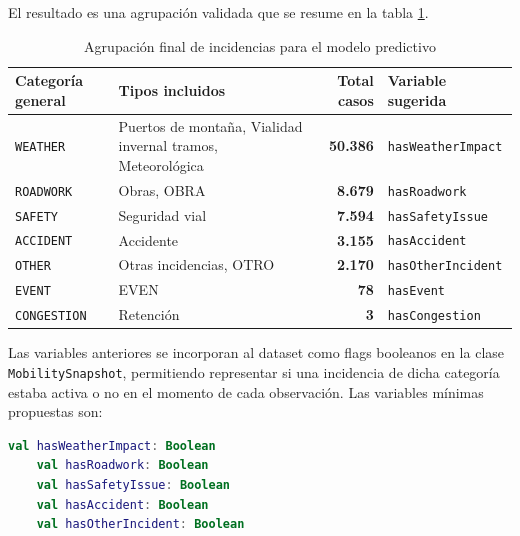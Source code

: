El resultado es una agrupación validada que se resume en la tabla \ref{tab:agrupacion_incidencias}.

\begin{table}[H]
	\centering
	\small
	\caption{Agrupación final de incidencias para el modelo predictivo}
	\label{tab:agrupacion_incidencias}
	\begin{tabularx}{\textwidth}{lXrX}
		\toprule
		\textbf{Categoría general} & \textbf{Tipos incluidos} & \textbf{Total casos} & \textbf{Variable sugerida} \\
		\midrule
		\texttt{WEATHER}    & Puertos de montaña, Vialidad invernal tramos, Meteorológica  & \textbf{50.386} & \texttt{hasWeatherImpact} \\
		\texttt{ROADWORK}   & Obras, OBRA                                                  & \textbf{8.679}  & \texttt{hasRoadwork} \\
		\texttt{SAFETY}     & Seguridad vial                                               & \textbf{7.594}  & \texttt{hasSafetyIssue} \\
		\texttt{ACCIDENT}   & Accidente                                                    & \textbf{3.155}  & \texttt{hasAccident} \\
		\texttt{OTHER}      & Otras incidencias, OTRO                                      & \textbf{2.170}  & \texttt{hasOtherIncident} \\
		\texttt{EVENT}      & EVEN                                                         & \textbf{78}     & \texttt{hasEvent} \\
		\texttt{CONGESTION} & Retención                                                    & \textbf{3}      & \texttt{hasCongestion} \\
		\bottomrule
	\end{tabularx}
\end{table}

Las variables anteriores se incorporan al dataset como flags booleanos en la clase \texttt{MobilitySnapshot}, permitiendo representar si una incidencia de dicha categoría estaba activa o no en el momento de cada observación. Las variables mínimas propuestas son:

\begin{lstlisting}[language=Kotlin, caption={Variables mínimas de incidencias en MobilitySnapshot}]
	val hasWeatherImpact: Boolean
	val hasRoadwork: Boolean
	val hasSafetyIssue: Boolean
	val hasAccident: Boolean
	val hasOtherIncident: Boolean
\end{lstlisting}

